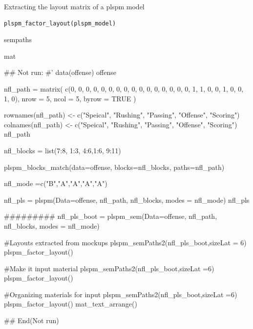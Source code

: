 \documentclass[a4paper]{book}
\begin{document}
%
\begin{Description}
Extracting the layout matrix of a plspm model
\end{Description}
%
\begin{Usage}
\begin{verbatim}
plspm_factor_layout(plspm_model)
\end{verbatim}
\end{Usage}
%
\begin{Arguments}
\begin{ldescription}
\item[\code{plspm\_model}] sempaths
\end{ldescription}
\end{Arguments}
%
\begin{Value}
mat
\end{Value}
%
\begin{Examples}
\begin{ExampleCode}

\#\# Not run: 
#'
data(offense)
offense %

nfl_path = matrix(
  c(0, 0, 0, 0, 0,
    0, 0, 0, 0, 0,
    0, 0, 0, 0, 0,
    0, 1, 1, 0, 0,
    1, 0, 0, 1, 0),
  nrow = 5, ncol = 5, byrow = TRUE )

rownames(nfl_path) <- c("Speical", "Rushing", "Passing", "Offense", "Scoring")
colnames(nfl_path) <- c("Speical", "Rushing", "Passing", "Offense", "Scoring")
nfl_path

nfl_blocks = list(7:8, 1:3, 4:6,1:6, 9:11)

plspm_blocks_match(data=offense, blocks=nfl_blocks,
                   paths=nfl_path)

nfl_mode =c("B","A","A","A","A")

nfl_pls = plspm(Data=offense, nfl_path, nfl_blocks, modes = nfl_mode)
nfl_pls%

#########
nfl_pls_boot = plspm_sem(Data=offense, nfl_path, nfl_blocks, modes = nfl_mode)

#Layouts extracted from mockups
plspm_semPaths2(nfl_pls_boot,sizeLat = 6)%
  plspm_factor_layout()

#Make it input material
plspm_semPaths2(nfl_pls_boot,sizeLat =6)%
  plspm_factor_layout() %

#Organizing materials for input
plspm_semPaths2(nfl_pls_boot,sizeLat =6)%
  plspm_factor_layout() %
  mat_text_arrange()

## End(Not run)



\end{ExampleCode}
\end{Examples}
\end{document}

